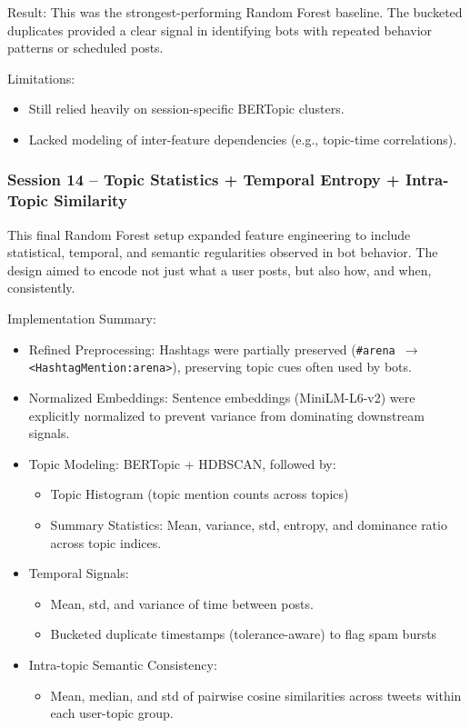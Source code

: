 \documentclass[conference]{IEEEtran}
\begin{document}
Result:
This was the strongest-performing Random Forest baseline. The bucketed duplicates provided a clear signal in identifying bots with repeated behavior patterns or scheduled posts.

Limitations:
\begin{itemize}
    \item Still relied heavily on session-specific BERTopic clusters.
    
    \item Lacked modeling of inter-feature dependencies (e.g., topic-time correlations).
\end{itemize}

\subsubsection{Session 14 – Topic Statistics + Temporal Entropy + Intra-Topic Similarity}
This final Random Forest setup expanded feature engineering to include statistical, temporal, and semantic regularities observed in bot behavior. 
The design aimed to encode not just what a user posts, but also how, and when, consistently.

Implementation Summary:
\begin{itemize}
    \item Refined Preprocessing: Hashtags were partially preserved (\texttt{\#arena $\rightarrow$ <HashtagMention:arena>}), preserving topic cues often used by bots.
    
    \item Normalized Embeddings: Sentence embeddings (MiniLM-L6-v2) were explicitly normalized to prevent variance from dominating downstream signals.
    
    \item Topic Modeling: BERTopic + HDBSCAN, followed by:
    \begin{itemize}
        \item Topic Histogram (topic mention counts across topics)
        \item Summary Statistics: Mean, variance, std, entropy, and dominance ratio across topic indices.
    \end{itemize}
    
    \item Temporal Signals:
    \begin{itemize}
        \item  Mean, std, and variance of time between posts.
        \item Bucketed duplicate timestamps (tolerance-aware) to flag spam bursts
    \end{itemize}
    
    \item Intra-topic Semantic Consistency:
    \begin{itemize}
        \item Mean, median, and std of pairwise cosine similarities across tweets within each user-topic group.
    \end{itemize}
\end{itemize}
\end{document}
